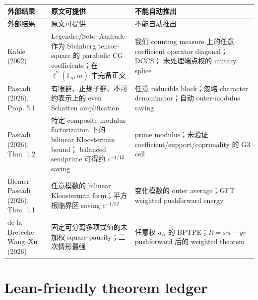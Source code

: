 \documentclass[11pt,a4paper]{ctexart}
\theoremstyle{definition}
\newcommand{\F}{\mathbb F}
\newcommand{\1}{\mathbf 1}
\begin{document}
\begin{center}
\begin{longtable}{p{}p{}p{}}
\toprule
外部结果 & 原文可提供 & 不能自动推出\\
\midrule
\endfirsthead
\toprule
外部结果 & 原文可提供 & 不能自动推出\\
\midrule
\endhead
Kable (2002)
& Legendre/Soto--Andrade 作为 Steinberg tensor-square 的 parabolic CG
coefficients；在 $\ell^2(\F_q,m)$ 中完备正交
& 我们 counting measure 上的任意 coefficient operator diagonal；DCCS；
未处理端点权的 unitary splice\\
Pascadi (2026), Prop. 5.1
& 有限群、正规子群、不可约表示上的 even Schatten amplification
& 任意 reducible block；忽略 character denominator；自动 outer-modulus saving\\
Pascadi (2026), Thm. 1.2
& 特定 composite modulus factorization 下的 bilinear Kloosterman bound；
balanced semiprime 可得约 $c^{-1/12}$ saving
& prime modulus；未验证 coefficient/support/coprimality 的 G3 cell\\
Blomer--Pascadi (2026), Thm. 1.1
& 任意模数的 bilinear Kloosterman form；平方根临界区 saving $c^{-1/32}$
& 变化模数的 outer average；GFT weighted pushforward energy\\
de la Bret\`eche--Wang--Xu (2026)
& 固定可分离多项式值的未加权 square-paucity；二次情形最强
& 任意权 $a_R$ 的 BPTPE；$R=xu-yv$ pushforward 后的 weighted theorem\\
\bottomrule
\end{longtable}
\end{center}

\section{Lean-friendly theorem ledger}
\end{document}
